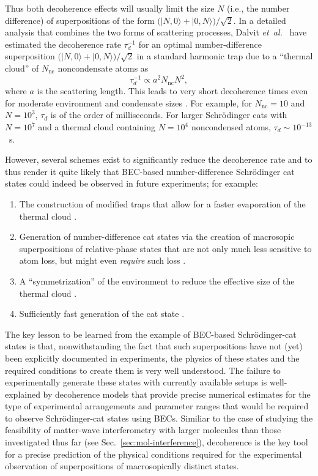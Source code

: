 \documentclass[twocolumn,aps,floatfix,amsmath,amssymb,showpacs,nofootinbib]{revtex4}
\newcommand{\be}{\begin{equation}} \newcommand{\ee}{\end{equation}}
\newcommand{\bn}{\begin{enumerate}} \newcommand{\en}{\end{enumerate}}
\newcommand{\etal}{\emph{et~al.\ }}
\newcommand{\ket}[1]{\ensuremath{|{#1\rangle}}}
\begin{document}
Thus both decoherence effects will usually limit the size $N$ (i.e.,
the number difference) of superpositions of the form $\bigl( \ket{N,0}
+ \ket{0,N} \bigr) / \sqrt{2}$. In a detailed analysis that combines
the two forms of scattering processes, Dalvit \etal \cite{Dalvit:2000:bb}
have estimated the decoherence rate $\tau_d^{-1}$ for an optimal
number-difference superposition $\bigl( \ket{N,0} + \ket{0,N} \bigr) /
\sqrt{2}$ in a standard harmonic trap due to a ``thermal cloud'' of
$N_\text{nc}$ noncondensate atoms as
%
\be
\tau_d^{-1} \propto  a^2 N_\text{nc} N^2,
\ee
%
where $a$ is the scattering length. This leads to very short
decoherence times even for moderate environment and condensate sizes
\cite{Dalvit:2000:bb,Louis:2001:mu}. For example, for $N_\text{nc}=10$
and $N=10^3$, $\tau_d$ is of the order of milliseconds. For larger
Schr\"odinger cats with $N=10^7$ and a thermal cloud containing
$N=10^4$ noncondensed atoms, $\tau_d \sim 10^{-13}$~s.  

However, several schemes exist to significantly reduce the decoherence
rate and to thus render it quite likely that BEC-based
number-difference Schr\"odinger cat states could indeed be observed in
future experiments; for example:

\bn

\item The construction of modified traps that allow for a faster
  evaporation of the thermal cloud \cite{Dalvit:2000:bb}.
  
\item Generation of number-difference cat states via the creation of
  macrosopic superpositions of relative-phase states that are not only
  much less sensitive to atom loss, but might even {\it require} such
  loss \cite{Dunningham:2001:da}.
  
\item A ``symmetrization'' of the environment to reduce the effective
  size of the thermal cloud \cite{Dalvit:2000:bb}.
  
\item Sufficiently fast generation of the cat state
  \cite{Micheli:2003:jn}.

\en

The key lesson to be learned from the example of BEC-based
Schr\"odinger-cat states is that, nonwithstanding the fact that such
superpositions have not (yet) been explicitly documented in
experiments, the physics of these states and the required conditions
to create them is very well understood. The failure to experimentally
generate these states with currently available setups is
well-explained by decoherence models that provide precise numerical
estimates for the type of experimental arrangements and parameter
ranges that would be required to observe Schr\"odinger-cat states
using BECs.  Similiar to the case of studying the feasibility of
matter-wave interferometry with larger molecules than those
investigated thus far (see Sec.~\ref{sec:mol-interference}),
decoherence is the key tool for a precise prediction of the physical
conditions required for the experimental observation of superpositions
of macrosopically distinct states. 
\end{document}
